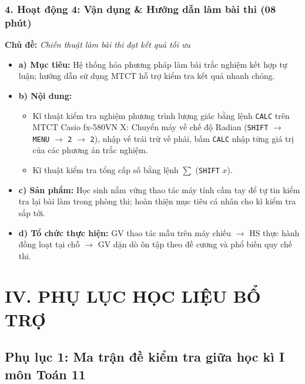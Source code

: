 \documentclass[12pt, a4paper]{article}
\begin{document}
\subsubsection*{4. Hoạt động 4: Vận dụng \& Hướng dẫn làm bài thi (08 phút)}
\textbf{Chủ đề:} \textit{Chiến thuật làm bài thi đạt kết quả tối ưu}
\begin{itemize}
    \item \textbf{a) Mục tiêu:} Hệ thống hóa phương pháp làm bài trắc nghiệm kết hợp tự luận; hướng dẫn sử dụng MTCT hỗ trợ kiểm tra kết quả nhanh chóng.
    \item \textbf{b) Nội dung:}
    \begin{itemize}
        \item Kĩ thuật kiểm tra nghiệm phương trình lượng giác bằng lệnh \texttt{CALC} trên MTCT Casio fx-580VN X: Chuyển máy về chế độ Radian (\texttt{SHIFT} $\to$ \texttt{MENU} $\to$ \texttt{2} $\to$ \texttt{2}), nhập vế trái trừ vế phải, bấm \texttt{CALC} nhập từng giá trị của các phương án trắc nghiệm.
        \item Kĩ thuật kiểm tra tổng cấp số bằng lệnh $\sum$ (\texttt{SHIFT} $x$).
    \end{itemize}
    \item \textbf{c) Sản phẩm:} Học sinh nắm vững thao tác máy tính cầm tay để tự tin kiểm tra lại bài làm trong phòng thi; hoàn thiện mục tiêu cá nhân cho kì kiểm tra sắp tới.
    \item \textbf{d) Tổ chức thực hiện:} GV thao tác mẫu trên máy chiếu $\to$ HS thực hành đồng loạt tại chỗ $\to$ GV dặn dò ôn tập theo đề cương và phổ biến quy chế thi.
\end{itemize}

\newpage

\section*{IV. PHỤ LỤC HỌC LIỆU BỔ TRỢ}

\subsection*{Phụ lục 1: Ma trận đề kiểm tra giữa học kì I môn Toán 11}
\end{document}
